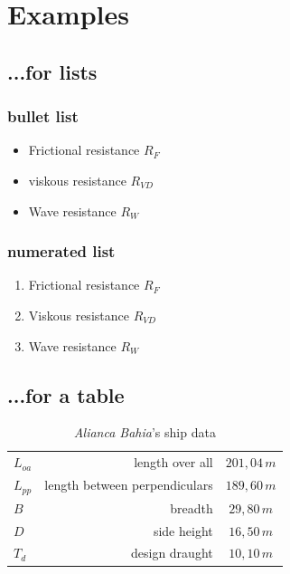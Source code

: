 \chapter{Examples}

\section{...for lists}\label{sec:Liste}

\subsection{bullet list}
\begin{itemize}
 \item Frictional resistance $R_F$
 \item viskous resistance $R_{VD}$
 \item Wave resistance $R_W$
\end{itemize}

\subsection{numerated list}

\begin{enumerate}
 \item Frictional resistance $R_F$
 \item Viskous resistance $R_{VD}$
 \item Wave resistance $R_W$
\end{enumerate}

\section{...for a table}
 \begin{table}[h!]
\caption[\textit{Alianca Bahia}'s ship data]{\textit{Alianca Bahia}'s ship data}
\centering
\begin{tabular}{l r c}
 \toprule
    $L_{oa}$ & length over all & $201,04\,m$ \\
    $L_{pp}$ & length between perpendiculars & $189,60\,m$ \\
    $B$ & breadth & $29,80\,m$ \\
    $D$& side height & $16,50\,m$ \\
    $T_d$ & design draught & $10,10\,m$ \\
\bottomrule 
\end{tabular}
\label{tab:shipData}
\end{table}

